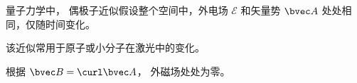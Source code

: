
\begin{issues}
\issueDraft
\end{issues}

量子力学中， 偶极子近似假设整个空间中，外电场 $\mathcal{E}$ 和矢量势 $\bvec A$ 处处相同，仅随时间变化。

该近似常用于原子或小分子在激光中的变化。

根据 $\bvec B = \curl \bvec A$， 外磁场处处为零。


